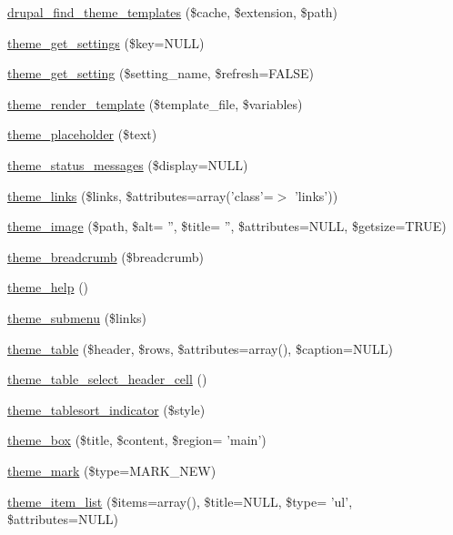 \begin{CompactItemize}
\hyperlink{includes_2theme_8inc_a755f6e8f11a62c9e90a6d7af55145b1}{drupal\_\-find\_\-theme\_\-templates} (\$cache, \$extension, \$path)
\item 
\hyperlink{includes_2theme_8inc_c64cf162740d831ad7655df4008b0c3a}{theme\_\-get\_\-settings} (\$key=NULL)
\item 
\hyperlink{includes_2theme_8inc_1f46caa33d71c0eb1d6a7018db7162f9}{theme\_\-get\_\-setting} (\$setting\_\-name, \$refresh=FALSE)
\item 
\hyperlink{includes_2theme_8inc_726ca00e65b455bb895c8abf1dfb1df2}{theme\_\-render\_\-template} (\$template\_\-file, \$variables)
\item 
\hyperlink{group__themeable_gc300e87edb69de9245c38a1d09c66adc}{theme\_\-placeholder} (\$text)
\item 
\hyperlink{group__themeable_g45e373d20b2cbc62ecd05ae849a2b3bd}{theme\_\-status\_\-messages} (\$display=NULL)
\item 
\hyperlink{group__themeable_g6a23e012993ee8a2494249148d15d2bf}{theme\_\-links} (\$links, \$attributes=array('class'=$>$ 'links'))
\item 
\hyperlink{group__themeable_g035987a258a89e8f1ea7e9ee0f64369b}{theme\_\-image} (\$path, \$alt= '', \$title= '', \$attributes=NULL, \$getsize=TRUE)
\item 
\hyperlink{group__themeable_g499898a137ccb56620058a9ad884363a}{theme\_\-breadcrumb} (\$breadcrumb)
\item 
\hyperlink{group__themeable_ge7158ac517c2c15972c742ef074d366d}{theme\_\-help} ()
\item 
\hyperlink{group__themeable_g9967b5f542549c520851500eb25c4ffe}{theme\_\-submenu} (\$links)
\item 
\hyperlink{group__themeable_g77f053aaa73bbeaa3943bf8f06ce625d}{theme\_\-table} (\$header, \$rows, \$attributes=array(), \$caption=NULL)
\item 
\hyperlink{group__themeable_ge2a1acba9910db3b633eb9339b39d65d}{theme\_\-table\_\-select\_\-header\_\-cell} ()
\item 
\hyperlink{group__themeable_ga114475e1c769831776ae8af627595bc}{theme\_\-tablesort\_\-indicator} (\$style)
\item 
\hyperlink{group__themeable_ga2b9684385ee0e8c0e8a8947925047ba}{theme\_\-box} (\$title, \$content, \$region= 'main')
\item 
\hyperlink{group__themeable_gf27d1fe596ce8f28199ca2bed5b9816d}{theme\_\-mark} (\$type=MARK\_\-NEW)
\item 
\hyperlink{group__themeable_g0f8d002d54905d758e38a3d516cbfe69}{theme\_\-item\_\-list} (\$items=array(), \$title=NULL, \$type= 'ul', \$attributes=NULL)

\end{CompactItemize}
